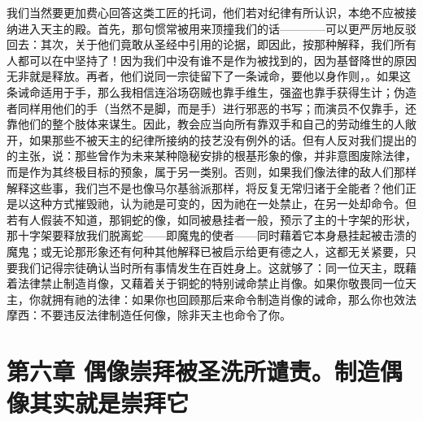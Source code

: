 我们当然要更加费心回答这类工匠的托词，他们若对纪律有所认识，本绝不应被接纳进入天主的殿。首先，那句惯常被用来顶撞我们的话————可以更严厉地反驳回去：其次，关于他们竟敢从圣经中引用的论据，即因此，按那种解释，我们所有人都可以在中坚持了！因为我们中没有谁不是作为被找到的，因为基督降世的原因无非就是释放。再者，他们说同一宗徒留下了一条诫命，要他以身作则，。如果这条诫命适用于手，那么我相信连浴场窃贼也靠手维生，强盗也靠手获得生计；伪造者同样用他们的手（当然不是脚，而是手）进行邪恶的书写；而演员不仅靠手，还靠他们的整个肢体来谋生。因此，教会应当向所有靠双手和自己的劳动维生的人敞开，如果那些不被天主的纪律所接纳的技艺没有例外的话。但有人反对我们提出的的主张，说：那些曾作为未来某种隐秘安排的根基形象的像，并非意图废除法律，而是作为其终极目标的预象，属于另一类别。否则，如果我们像法律的敌人们那样解释这些事，我们岂不是也像马尔基翁派那样，将反复无常归诸于全能者？他们正是以这种方式摧毁祂，认为祂是可变的，因为祂在一处禁止，在另一处却命令。但若有人假装不知道，那铜蛇的像，如同被悬挂者一般，预示了主的十字架的形状，那十字架要释放我们脱离蛇——即魔鬼的使者——同时藉着它本身悬挂起被击溃的魔鬼；或无论那形象还有何种其他解释已被启示给更有德之人，这都无关紧要，只要我们记得宗徒确认当时所有事情发生在百姓身上。这就够了：同一位天主，既藉着法律禁止制造肖像，又藉着关于铜蛇的特别诫命禁止肖像。如果你敬畏同一位天主，你就拥有祂的法律：如果你也回顾那后来命令制造肖像的诫命，那么你也效法摩西：不要违反法律制造任何像，除非天主也命令了你。\par


\section{第六章 偶像崇拜被圣洗所谴责。制造偶像其实就是崇拜它}

